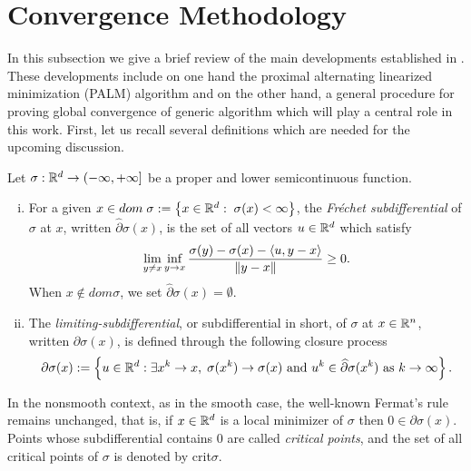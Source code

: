\section{Convergence Methodology} \label{State_PALM_Theory}

In this subsection we give a brief review of the main developments established in \cite
{BST2014}. These developments include on one hand the proximal alternating linearized minimization (PALM) algorithm and on the other hand, a general procedure for proving global convergence of generic algorithm which will play a central role in this work. First, let us recall several definitions which are needed for the upcoming discussion.

\begin{definition}[Subdifferentials] \label{subdiff_def}
	Let $\sigma : \mathbb{R}^d \rightarrow (-\infty,+\infty]$ be a proper and lower semicontinuous function.
	\begin{enumerate}[(i)]
		\item For a given $x \in dom\;\sigma := \left\lbrace x \in \mathbb{R}^d : \; \sigma(x) < \infty \right\rbrace$, the \textit{Fr\'echet subdifferential} of $\sigma$ at $x$, written $\widehat{\partial}\sigma(x)$, is the set of all vectors $u \in \mathbb{R}^d$ which satisfy
		\begin{equation*}
			\lim\limits_{y \neq x} \inf\limits_{y \rightarrow x} \frac{\sigma(y) - \sigma(x) - \left\langle u, y-x \right\rangle}{\left\Vert {y-x} \right\Vert} \geq 0.
		\end{equation*}
		When $x \notin dom\sigma$, we set $\widehat{\partial}\sigma(x) = \emptyset$.
		\item The \textit{limiting-subdifferential}, or subdifferential in short, of $\sigma$ at $x \in \mathbb{R}^n$, written $\partial\sigma(x)$, is defined through the following closure process
		\begin{equation*}
			\partial\sigma(x) := \left\lbrace u \in \mathbb{R}^d : \exists x^k \rightarrow x, \; \sigma(x^k)\rightarrow \sigma(x) \text{ and } u^k \in \widehat{\partial}\sigma(x^k) \text{ as } k \rightarrow \infty \right\rbrace.
		\end{equation*}
	\end{enumerate}
\end{definition}
In the nonsmooth context, as in the smooth case, the well-known Fermat's rule remains unchanged, that is, if $x \in \mathbb{R}^d$ is a local minimizer of $\sigma$ then $0 \in \partial\sigma(x)$. Points whose subdifferential contains $0$ are called \textit{critical points}, and the set of all critical points of $\sigma$ is denoted by crit$\sigma$.\medskip

